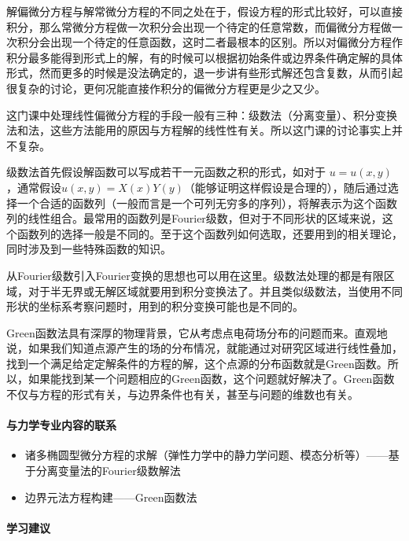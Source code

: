 解偏微分方程与解常微分方程的不同之处在于，假设方程的形式比较好，可以直接积分，那么常微分方程做一次积分会出现一个待定的任意常数，而偏微分方程做一次积分会出现一个待定的任意函数，这时二者最根本的区别。所以对偏微分方程作积分最多能得到形式上的解，有的时候可以根据初始条件或边界条件确定解的具体形式，然而更多的时候是没法确定的，退一步讲有些形式解还包含复数，从而引起很复杂的讨论，更何况能直接作积分的偏微分方程更是少之又少。

这门课中处理线性偏微分方程的手段一般有三种：级数法（分离变量）、积分变换法和法，这些方法能用的原因与方程解的线性性有关。所以这门课的讨论事实上并不复杂。

级数法首先假设解函数可以写成若干一元函数之积的形式，如对于 $u = u (x,y)$，通常假设$u(x,y)=X(x)Y(y)$（能够证明这样假设是合理的），随后通过选择一个合适的函数列（一般而言是一个可列无穷多的序列），将解表示为这个函数列的线性组合。最常用的函数列是Fourier级数，但对于不同形状的区域来说，这个函数列的选择一般是不同的。至于这个函数列如何选取，还要用到的相关理论，同时涉及到一些特殊函数的知识。

从Fourier级数引入Fourier变换的思想也可以用在这里。级数法处理的都是有限区域，对于半无界或无解区域就要用到积分变换法了。并且类似级数法，当使用不同形状的坐标系考察问题时，用到的积分变换可能也是不同的。

Green函数法具有深厚的物理背景，它从考虑点电荷场分布的问题而来。直观地说，如果我们知道点源产生的场的分布情况，就能通过对研究区域进行线性叠加，找到一个满足给定定解条件的方程的解，这个点源的分布函数就是Green函数。所以，如果能找到某一个问题相应的Green函数，这个问题就好解决了。Green函数不仅与方程的形式有关，与边界条件也有关，甚至与问题的维数也有关。

\paragraph{与力学专业内容的联系}

\begin{itemize}
    \item 诸多椭圆型微分方程的求解（弹性力学中的静力学问题、模态分析等）——基于分离变量法的Fourier级数解法

    \item 边界元法方程构建——Green函数法
\end{itemize}

\paragraph{学习建议}

